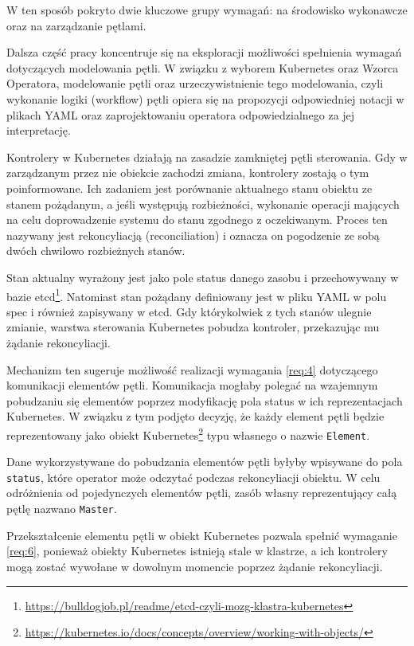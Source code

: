 W ten sposób pokryto dwie kluczowe grupy wymagań: na środowisko wykonawcze oraz na zarządzanie pętlami. 

Dalsza część pracy koncentruje się na eksploracji możliwości spełnienia wymagań dotyczących modelowania pętli. W związku z wyborem Kubernetes oraz Wzorca Operatora, modelowanie pętli oraz urzeczywistnienie tego modelowania, czyli wykonanie logiki (workflow) pętli opiera się na propozycji odpowiedniej notacji w plikach YAML oraz zaprojektowaniu operatora odpowiedzialnego za jej interpretację.

Kontrolery w Kubernetes działają na zasadzie zamkniętej pętli sterowania. Gdy w zarządzanym przez nie obiekcie zachodzi zmiana, kontrolery zostają o tym poinformowane. Ich zadaniem jest porównanie aktualnego stanu obiektu ze stanem pożądanym, a jeśli występują rozbieżności, wykonanie operacji mających na celu doprowadzenie systemu do stanu zgodnego z oczekiwanym. Proces ten nazywany jest rekoncyliacją (reconciliation) i oznacza on pogodzenie ze sobą dwóch chwilowo rozbieżnych stanów.

Stan aktualny wyrażony jest jako pole status danego zasobu i przechowywany w bazie etcd\footnote{\url{https://bulldogjob.pl/readme/etcd-czyli-mozg-klastra-kubernetes}}. Natomiast stan pożądany definiowany jest w pliku YAML w polu spec i również zapisywany w etcd. Gdy którykolwiek z tych stanów ulegnie zmianie, warstwa sterowania Kubernetes pobudza kontroler, przekazując mu żądanie rekoncyliacji.

Mechanizm ten sugeruje możliwość realizacji wymagania \ref{req:4} dotyczącego komunikacji elementów pętli. Komunikacja mogłaby polegać na wzajemnym pobudzaniu się elementów poprzez modyfikację pola status w ich reprezentacjach Kubernetes. W związku z tym podjęto decyzję, że każdy element pętli będzie reprezentowany jako obiekt Kubernetes\footnote{\url{https://kubernetes.io/docs/concepts/overview/working-with-objects/}} typu własnego o nazwie \texttt{Element}.

Dane wykorzystywane do pobudzania elementów pętli byłyby wpisywane do pola \texttt{status}, które operator może odczytać podczas rekoncyliacji obiektu. W celu odróżnienia od pojedynczych elementów pętli, zasób własny reprezentujący całą pętlę nazwano \texttt{Master}.

Przekształcenie elementu pętli w obiekt Kubernetes pozwala spełnić wymaganie \ref{req:6}, ponieważ obiekty Kubernetes istnieją stale w klastrze, a ich kontrolery mogą zostać wywołane w dowolnym momencie poprzez żądanie rekoncyliacji.

